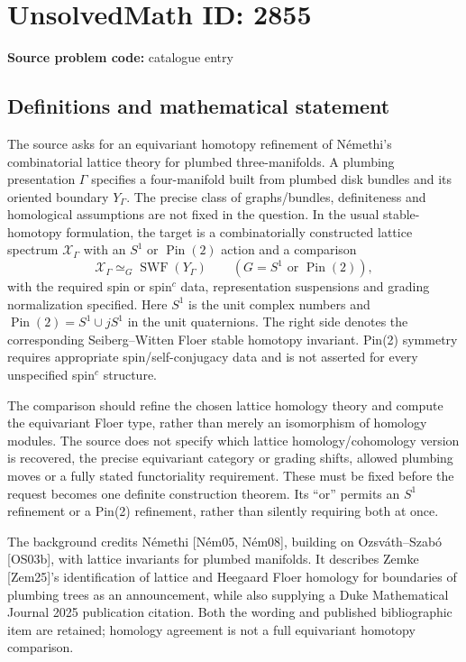 \documentclass[11pt]{article}
\begin{document}
\section*{UnsolvedMath ID: 2855}
\textbf{Source problem code:} catalogue entry
\subsection{Definitions and mathematical statement}
The source asks for an equivariant homotopy refinement of Némethi's combinatorial lattice theory for plumbed three-manifolds. A plumbing presentation $\Gamma$ specifies a four-manifold built from plumbed disk bundles and its oriented boundary $Y_\Gamma$. The precise class of graphs/bundles, definiteness and homological assumptions are not fixed in the question. In the usual stable-homotopy formulation, the target is a combinatorially constructed lattice spectrum $\mathcal X_\Gamma$ with an $S^1$ or $\operatorname{Pin}(2)$ action and a comparison
\[
\mathcal X_\Gamma\simeq_G\operatorname{SWF}(Y_\Gamma)
\qquad(G=S^1\text{ or }\operatorname{Pin}(2)),
\]
with the required spin or spin$^c$ data, representation suspensions and grading normalization specified. Here $S^1$ is the unit complex numbers and $\operatorname{Pin}(2)=S^1\cup jS^1$ in the unit quaternions. The right side denotes the corresponding Seiberg--Witten Floer stable homotopy invariant. Pin(2) symmetry requires appropriate spin/self-conjugacy data and is not asserted for every unspecified spin$^c$ structure.

The comparison should refine the chosen lattice homology theory and compute the equivariant Floer type, rather than merely an isomorphism of homology modules. The source does not specify which lattice homology/cohomology version is recovered, the precise equivariant category or grading shifts, allowed plumbing moves or a fully stated functoriality requirement. These must be fixed before the request becomes one definite construction theorem. Its ``or'' permits an $S^1$ refinement or a Pin(2) refinement, rather than silently requiring both at once.

The background credits Némethi [Ném05, Ném08], building on Ozsváth--Szabó [OS03b], with lattice invariants for plumbed manifolds. It describes Zemke [Zem25]'s identification of lattice and Heegaard Floer homology for boundaries of plumbing trees as an announcement, while also supplying a Duke Mathematical Journal 2025 publication citation. Both the wording and published bibliographic item are retained; homology agreement is not a full equivariant homotopy comparison.
\end{document}
